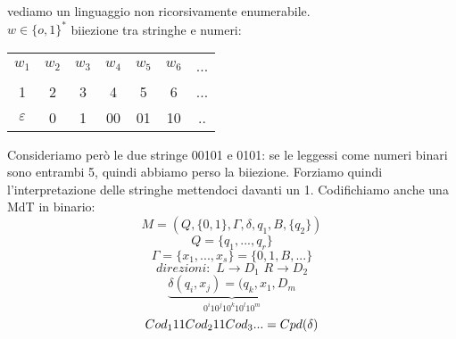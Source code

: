 \documentclass[a4paper,12pt, oneside]{book}
\begin{document}
	\begin{esempio}
		vediamo un linguaggio non ricorsivamente enumerabile.\\
		$w\in\{o,1\}^*$ biiezione tra stringhe e numeri:
		\begin{center}
			\begin{tabular}{c c c c c c c}
				$w_1$         & $w_2$ & $w_3$ & $w_4$ & $w_5$ & $w_6$ & ... \\
				1             & 2     & 3     & 4     & 5     & 6     & ... \\
				$\varepsilon$ & 0     & 1     & 00    & 01    & 10    & ..
			\end{tabular}
		\end{center}
		Consideriamo però le due stringe 00101 e 0101: se le leggessi come numeri binari sono entrambi
		5, quindi abbiamo perso la biiezione.
		Forziamo quindi l'interpretazione delle stringhe mettendoci davanti un 1.
		Codifichiamo anche una MdT in binario:
		$$M=(Q,\{0,1\},\Gamma,\delta,q_1,B,\{q_2\})$$
		$$Q=\{q_1,...,q_r\}$$
		$$\Gamma=\{x_1,...,x_s\}=\{0,1,B,...\}$$
		$$direzioni:\,\,L\to D_1\,\,R\to D_2$$
		$$\underbrace{\delta(q_i,x_j)=(q_k,x_1,D_m}_{0^i10^j10^k10^l10^m}$$
		$$Cod_111Cod_211Cod_3\\...=Cpd(\delta)$$
	\end{esempio}
\end{document}
